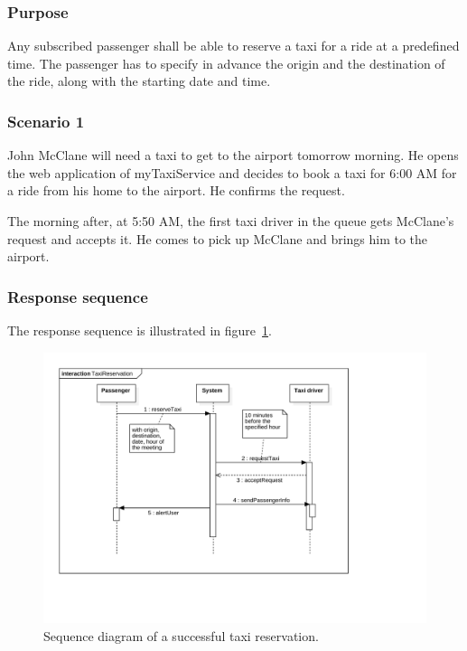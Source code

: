 \subsubsection{Purpose}

Any subscribed passenger shall be able to reserve a taxi for a ride at a predefined time. The passenger has to specify in advance the origin and the destination of the ride, along with the starting date and time.

\subsubsection{Scenario 1}
John McClane will need a taxi to get to the airport tomorrow morning. He opens the web application of myTaxiService and decides to book a taxi for 6:00 AM for a ride from his home to the airport. He confirms the request.

The morning after, at 5:50 AM, the first taxi driver in the queue gets McClane's request and accepts it. He comes to pick up McClane and brings him to the airport.

\subsubsection{Response sequence}
The response sequence is illustrated in figure~\ref{fig:sequence-taxireservation}.
\begin{figure}[ht]
\includegraphics[width=\textwidth]{diagrams/sequence_taxireservation.pdf}
\caption{Sequence diagram of a successful taxi reservation.}
\label{fig:sequence-taxireservation}
\end{figure}

